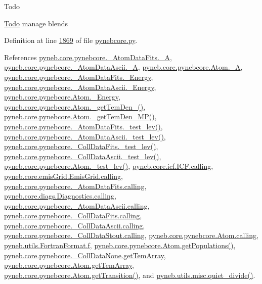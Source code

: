 \begin{DoxyRefDesc}{Todo}
\item[\hyperlink{todo__todo000002}{Todo}]manage blends \end{DoxyRefDesc}


Definition at line \hyperlink{pynebcore_8py_source_l01869}{1869} of file \hyperlink{pynebcore_8py_source}{pynebcore.\-py}.



References \hyperlink{pynebcore_8py_source_l00100}{pyneb.\-core.\-pynebcore.\-\_\-\-Atom\-Data\-Fits.\-\_\-\-A}, \hyperlink{pynebcore_8py_source_l00415}{pyneb.\-core.\-pynebcore.\-\_\-\-Atom\-Data\-Ascii.\-\_\-\-A}, \hyperlink{pynebcore_8py_source_l01319}{pyneb.\-core.\-pynebcore.\-Atom.\-\_\-\-A}, \hyperlink{pynebcore_8py_source_l00101}{pyneb.\-core.\-pynebcore.\-\_\-\-Atom\-Data\-Fits.\-\_\-\-Energy}, \hyperlink{pynebcore_8py_source_l00413}{pyneb.\-core.\-pynebcore.\-\_\-\-Atom\-Data\-Ascii.\-\_\-\-Energy}, \hyperlink{pynebcore_8py_source_l01320}{pyneb.\-core.\-pynebcore.\-Atom.\-\_\-\-Energy}, \hyperlink{pynebcore_8py_source_l01869}{pyneb.\-core.\-pynebcore.\-Atom.\-\_\-get\-Tem\-Den\-\_()}, \hyperlink{pynebcore_8py_source_l02046}{pyneb.\-core.\-pynebcore.\-Atom.\-\_\-get\-Tem\-Den\-\_\-\-M\-P()}, \hyperlink{pynebcore_8py_source_l00178}{pyneb.\-core.\-pynebcore.\-\_\-\-Atom\-Data\-Fits.\-\_\-test\-\_\-lev()}, \hyperlink{pynebcore_8py_source_l00447}{pyneb.\-core.\-pynebcore.\-\_\-\-Atom\-Data\-Ascii.\-\_\-test\-\_\-lev()}, \hyperlink{pynebcore_8py_source_l00677}{pyneb.\-core.\-pynebcore.\-\_\-\-Coll\-Data\-Fits.\-\_\-test\-\_\-lev()}, \hyperlink{pynebcore_8py_source_l01045}{pyneb.\-core.\-pynebcore.\-\_\-\-Coll\-Data\-Ascii.\-\_\-test\-\_\-lev()}, \hyperlink{pynebcore_8py_source_l01525}{pyneb.\-core.\-pynebcore.\-Atom.\-\_\-test\-\_\-lev()}, \hyperlink{icf_8py_source_l00016}{pyneb.\-core.\-icf.\-I\-C\-F.\-calling}, \hyperlink{emis_grid_8py_source_l00044}{pyneb.\-core.\-emis\-Grid.\-Emis\-Grid.\-calling}, \hyperlink{pynebcore_8py_source_l00097}{pyneb.\-core.\-pynebcore.\-\_\-\-Atom\-Data\-Fits.\-calling}, \hyperlink{diags_8py_source_l00169}{pyneb.\-core.\-diags.\-Diagnostics.\-calling}, \hyperlink{pynebcore_8py_source_l00318}{pyneb.\-core.\-pynebcore.\-\_\-\-Atom\-Data\-Ascii.\-calling}, \hyperlink{pynebcore_8py_source_l00585}{pyneb.\-core.\-pynebcore.\-\_\-\-Coll\-Data\-Fits.\-calling}, \hyperlink{pynebcore_8py_source_l00936}{pyneb.\-core.\-pynebcore.\-\_\-\-Coll\-Data\-Ascii.\-calling}, \hyperlink{pynebcore_8py_source_l01156}{pyneb.\-core.\-pynebcore.\-\_\-\-Coll\-Data\-Stout.\-calling}, \hyperlink{pynebcore_8py_source_l01229}{pyneb.\-core.\-pynebcore.\-Atom.\-calling}, \hyperlink{_fortran_format_8py_source_l00318}{pyneb.\-utils.\-Fortran\-Format.\-f}, \hyperlink{pynebcore_8py_source_l01562}{pyneb.\-core.\-pynebcore.\-Atom.\-get\-Populations()}, \hyperlink{pynebcore_8py_source_l00075}{pyneb.\-core.\-pynebcore.\-\_\-\-Coll\-Data\-None.\-get\-Tem\-Array}, \hyperlink{pynebcore_8py_source_l01284}{pyneb.\-core.\-pynebcore.\-Atom.\-get\-Tem\-Array}, \hyperlink{pynebcore_8py_source_l01472}{pyneb.\-core.\-pynebcore.\-Atom.\-get\-Transition()}, and \hyperlink{misc_8py_source_l00302}{pyneb.\-utils.\-misc.\-quiet\-\_\-divide()}.



